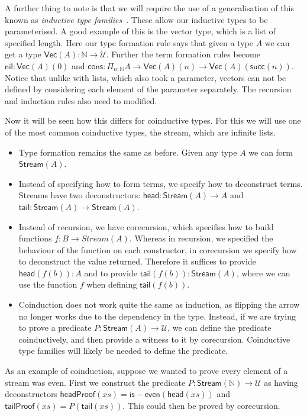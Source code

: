 \documentclass[draft]{article}
\theoremstyle{definition} \newtheorem{definition}{Definition}
\theoremstyle{remark} \newtheorem{remark}{Remark}
\begin{document}
A further thing to note is that we will require the use of a
generalisation of this known as \emph{inductive type
  families}~\cite[Section 5.7]{hottbook}. These allow our inductive
types to be parameterised. A good example of this is the vector type,
which is a list of specified length. Here our type formation rule says
that given a type \(A\) we can get a type \(\mathsf{Vec}(A) :
\mathbb{N} \to \mathcal{U}\). Further the term formation rules become
\(\mathsf{nil} : \mathsf{Vec}(A)(0)\) and \(\mathsf{cons} : \Pi_{n :
  \mathbb{N}} A \to \mathsf{Vec}(A)(n) \to
\mathsf{Vec}(A)(\mathsf{succ}(n))\). Notice that unlike with lists,
which also took a parameter, vectors can not be defined by considering
each element of the parameter separately. The recursion and induction
rules also need to modified.

Now it will be seen how this differs for coinductive types. For this
we will use one of the most common coinductive types, the stream,
which are infinite lists.

\begin{itemize}
\item Type formation remains the same as before. Given any type \(A\)
  we can form \(\mathsf{Stream}(A)\).
\item Instead of specifying how to form terms, we specify how to
  deconstruct terms. Streams have two deconstructors: \(\mathsf{head}
  : \mathsf{Stream}(A) \to A\) and \(\mathsf{tail} :
  \mathsf{Stream}(A) \to \mathsf{Stream}(A)\).
\item Instead of recursion, we have corecursion, which specifies how
  to build functions \(f : B \to Stream(A)\). Whereas in recursion, we
  specified the behaviour of the function on each constructor, in
  corecursion we specify how to deconstruct the value returned.
  Therefore it suffices to provide \(\mathsf{head}(f(b)) : A\) and to
  provide \(\mathsf{tail}(f(b)) : \mathsf{Stream}(A)\), where we can
  use the function \(f\) when defining \(\mathsf{tail}(f(b))\).
\item Coinduction does not work quite the same as induction, as
  flipping the arrow no longer works due to the dependency in the
  type. Instead, if we are trying to prove a predicate \(P :
  \mathsf{Stream}(A) \to \mathcal{U}\), we can define the predicate
  coinductively, and then provide a witness to it by corecursion.
  Coinductive type families will likely be needed to define the
  predicate.
\end{itemize}

As an example of coinduction, suppose we wanted to prove every element
of a stream was even. First we construct the predicate \(P :
\mathsf{Stream}(\mathbb{N}) \to \mathcal{U}\) as having deconstructors
\(\mathsf{headProof}(xs) = \mathsf{is{-}even}(\mathsf{head}(xs))\) and
\(\mathsf{tailProof}(xs) = P(\mathsf{tail}(xs))\). This could then be
proved by corecursion.
\end{document}
